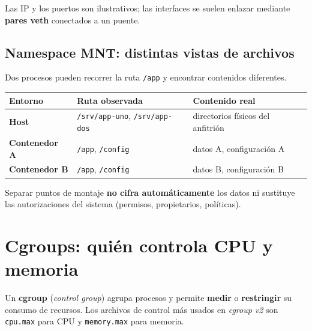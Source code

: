 \documentclass[11pt,a4paper]{article}
\newcommand{\cmd}[1]{\texttt{#1}}
\begin{document}
Las IP y los puertos son ilustrativos; las interfaces se suelen enlazar mediante
\textbf{pares veth} conectados a un puente.

\subsection{Namespace MNT: distintas vistas de archivos}

Dos procesos pueden recorrer la ruta \cmd{/app} y encontrar contenidos diferentes.

\begin{center}
\renewcommand{\arraystretch}{1.3}
\begin{tabularx}{\textwidth}{@{}>{\bfseries}l X X@{}}
\toprule
\textbf{\normalfont\color{azulprof} Entorno} & \textbf{\color{azulprof} Ruta observada} & \textbf{\color{azulprof} Contenido real} \\
\midrule
Host          & \cmd{/srv/app-uno}, \cmd{/srv/app-dos} & directorios físicos del anfitrión \\
Contenedor A  & \cmd{/app}, \cmd{/config} & datos A, configuración A \\
Contenedor B  & \cmd{/app}, \cmd{/config} & datos B, configuración B \\
\bottomrule
\end{tabularx}
\end{center}

\begin{errorbox}
Separar puntos de montaje \textbf{no cifra automáticamente} los datos ni sustituye las
autorizaciones del sistema (permisos, propietarios, políticas).
\end{errorbox}

\section{Cgroups: quién controla CPU y memoria}

Un \textbf{cgroup} (\emph{control group}) agrupa procesos y permite \textbf{medir} o
\textbf{restringir} su consumo de recursos. Los archivos de control más usados en
\emph{cgroup v2} son \cmd{cpu.max} para CPU y \cmd{memory.max} para memoria.

\begin{center}
\end{center}
\end{document}
